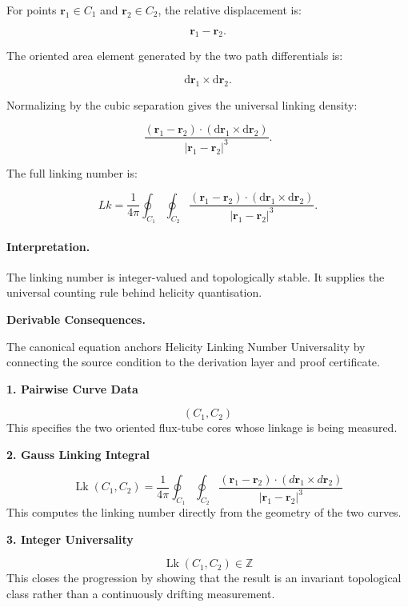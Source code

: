 For points $\mathbf{r}_1\in C_1$ and $\mathbf{r}_2\in C_2$, the relative displacement is:

\begin{equation}
\mathbf{r}_1-\mathbf{r}_2 .
\end{equation}

The oriented area element generated by the two path differentials is:

\begin{equation}
\mathrm{d}\mathbf{r}_1\times \mathrm{d}\mathbf{r}_2 .
\end{equation}

Normalizing by the cubic separation gives the universal linking density:

\begin{equation}
\frac{
(\mathbf{r}_1-\mathbf{r}_2)
\cdot
(\mathrm{d}\mathbf{r}_1\times \mathrm{d}\mathbf{r}_2)
}{
|\mathbf{r}_1-\mathbf{r}_2|^3
}.
\end{equation}

The full linking number is:

\begin{equation}
\boxed{
Lk
=
\frac{1}{4\pi}
\oint_{C_1}
\oint_{C_2}
\frac{
(\mathbf{r}_1-\mathbf{r}_2)
\cdot
(\mathrm{d}\mathbf{r}_1\times \mathrm{d}\mathbf{r}_2)
}{
|\mathbf{r}_1-\mathbf{r}_2|^3
}.
}
\end{equation}

\paragraph{Interpretation.}
The linking number is integer-valued and topologically stable. It supplies the universal counting rule behind helicity quantisation.

\par\vspace{0.35em}
\noindent\textbf{Derivable Consequences.}\quad
\begingroup
\footnotesize
\raggedright
The canonical equation anchors Helicity Linking Number Universality by connecting the source condition to the derivation layer and proof certificate.
\par\endgroup

\noindent\textbf{1. Pairwise Curve Data}\par
\[
(C_{1}, C_{2})
\]
\noindent This specifies the two oriented flux-tube cores whose linkage is being measured.\par
\noindent\textbf{2. Gauss Linking Integral}\par
\[
\operatorname{Lk}(C_{1},C_{2})
=
\frac{1}{4\pi}
\oint_{C_{1}}\oint_{C_{2}}
\frac{(\mathbf{r}_{1}-\mathbf{r}_{2})\cdot
\left(d\mathbf{r}_{1}\times d\mathbf{r}_{2}\right)}
{\lvert \mathbf{r}_{1}-\mathbf{r}_{2} \rvert^{3}}
\]
\noindent This computes the linking number directly from the geometry of the two curves.\par
\noindent\textbf{3. Integer Universality}\par
\[
\operatorname{Lk}(C_{1},C_{2}) \in \mathbb{Z}
\]
\noindent This closes the progression by showing that the result is an invariant topological class rather than a continuously drifting measurement.\par

